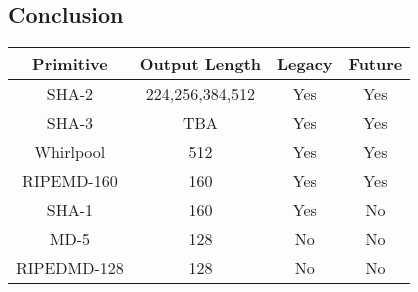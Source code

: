 \subsection{Conclusion}
\begin{table}[!h]
    \centering
    \begin{tabular}{c|c|c|c}
        Primitive & Output Length & Legacy & Future \\
        \hline
        SHA-2 & 224,256,384,512 & Yes & Yes \\
        SHA-3 & TBA & Yes & Yes \\
        Whirlpool & 512 & Yes & Yes \\
        \hline
        RIPEMD-160 & 160 & Yes & Yes \\
        SHA-1 & 160 & Yes & No \\
        \hline
        MD-5 & 128 & No & No \\
        RIPEDMD-128 & 128 & No & No \\
    \end{tabular}
\end{table}


